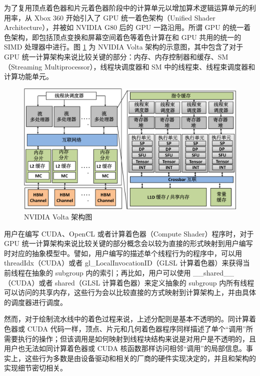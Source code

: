 为了复用顶点着色器和片元着色器阶段中的计算单元以增加算术逻辑运算单元的利用率，从 Xbox 360 \cite{1624324}开始引入了 GPU 统一着色架构（Unified Shader Architecture），并被如 NVIDIA G80 \cite{4523358}后的 GPU 一路沿用。所谓 GPU 的统一着色架构，即包括顶点变换和屏幕空间着色等着色计算在和 GPU 共用的统一的 SIMD 处理器中进行。图 \ref{fig:volta_arch} 为 NVIDIA Volta 架构的示意图，其中包含了对于 GPU 统一计算架构来说比较关键的部分：内存、内存控制器和缓存、SM（Streaming Multiprocessor），线程块调度器和 SM 中的线程束、线程束调度器和计算功能单元。

\begin{figure}
    \centering
    \includegraphics[width=1.0\linewidth]{figures/Volta_archi-crop-zh.pdf}
    \caption{NVIDIA Volta 架构图\cite{9138922}}
    \label{fig:volta_arch}
\end{figure}

用户在编写 CUDA、OpenCL 或者计算着色器（Compute Shader）程序时，对于 GPU 统一计算架构来说比较关键的部分概念会以较为直接的形式映射到用户编写时对应的抽象模型中。譬如，用户编写的描述单个线程行为的程序中，可以用 threadIdx（CUDA）或者 gl\_LocalInvocationID（GLSL 计算着色器）来获得当前线程在抽象的 subgroup 内的索引；再比如，用户可以使用 \_\_shared\_\_（CUDA）或者 shared（GLSL 计算着色器）来定义抽象的 subgroup 内所有线程可以访问的共享内存，这些行为会以比较直接的方式映射到计算架构上，并由具体的调度器进行调度。

然而，对于绘制流水线中的着色过程来说，上述分配则是基本不透明的。同计算着色器或 CUDA 代码一样，顶点、片元和几何着色器程序同样描述了单个“调用”所需要执行的操作；但该调用是如何映射到线程块结构来说是对用户是不透明的，且用户也无法如同计算着色器或 CUDA 核函数那样访问相邻“调用”的局部信息。事实上，这些行为多数是由设备驱动和相关的厂商的硬件实现决定的，并且和架构的实现细节密切相关。

